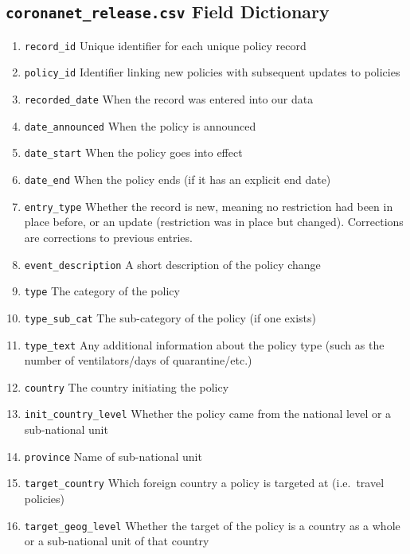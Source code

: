 \documentclass[]{article}
\providecommand{\tightlist}{%
  \setlength{\itemsep}{0pt}\setlength{\parskip}{0pt}}
\begin{document}
\hypertarget{coronanet_release.csv-field-dictionary}{%
\subsection*{\texorpdfstring{\texttt{coronanet\_release.csv} Field Dictionary}{coronanet\_release.csv Field Dictionary}}\label{coronanet_release.csv-field-dictionary}}

\begin{enumerate}
\def\labelenumi{\arabic{enumi}.}
\tightlist
\item
  \texttt{record\_id} Unique identifier for each unique policy record
\item
  \texttt{policy\_id} Identifier linking new policies with subsequent updates to policies
\item
  \texttt{recorded\_date} When the record was entered into our data
\item
  \texttt{date\_announced} When the policy is announced
\item
  \texttt{date\_start} When the policy goes into effect
\item
  \texttt{date\_end} When the policy ends (if it has an explicit end date)
\item
  \texttt{entry\_type} Whether the record is new, meaning no restriction had been in place before, or an update (restriction was in place but changed). Corrections are corrections to previous entries.
\item
  \texttt{event\_description} A short description of the policy change
\item
  \texttt{type} The category of the policy
\item
  \texttt{type\_sub\_cat} The sub-category of the policy (if one exists)
\item
  \texttt{type\_text} Any additional information about the policy type (such as the number of ventilators/days of quarantine/etc.)
\item
  \texttt{country} The country initiating the policy
\item
  \texttt{init\_country\_level} Whether the policy came from the national level or a sub-national unit
\item
  \texttt{province} Name of sub-national unit
\item
  \texttt{target\_country} Which foreign country a policy is targeted at (i.e.~travel policies)
\item
  \texttt{target\_geog\_level} Whether the target of the policy is a country as a whole or a sub-national unit of that country

\end{enumerate}
\end{document}
